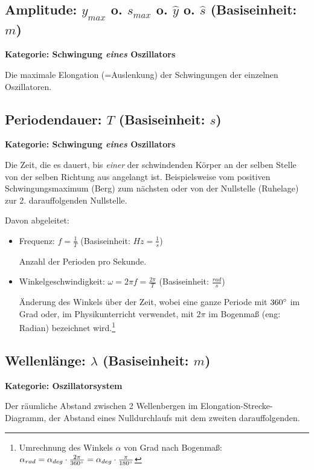 \subsection[Amplitude]{Amplitude: $y_{max}$ o. $s_{max}$ o. $\hat{y}$ o. $\hat{s}$ (Basiseinheit: $m$)}

\textbf{Kategorie: Schwingung \textit{eines} Oszillators}

\noindent Die maximale Elongation (=\glqq Auslenkung\grqq) der Schwingungen der einzelnen Oszillatoren.



\subsection[Periodendauer]{Periodendauer: $T$ (Basiseinheit: $s$)}

\textbf{Kategorie: Schwingung \textit{eines} Oszillators}
	
\noindent Die Zeit, die es dauert, bis \emph{einer} der schwindenden Körper an der selben Stelle von der selben Richtung aus angelangt ist. Beispielsweise vom positiven Schwingungsmaximum (\glqq Berg\grqq) zum nächsten oder von der Nullstelle (\glqq Ruhelage\grqq) zur 2. darauffolgenden Nullstelle.

Davon abgeleitet:
\begin{itemize}
	\item Frequenz: $f=\frac{1}{T}$ (Basiseinheit: $Hz=\frac{1}{s}$)
	
	Anzahl der Perioden pro Sekunde.
	\item Winkelgeschwindigkeit: $\omega=2 \pi f=\frac{2 \pi}{T}$ (Basiseinheit: $\frac{rad}{s}$)
		
	Änderung des Winkels über der Zeit, wobei eine ganze Periode mit $360 \degree$ im Grad oder, im Physikunterricht verwendet, mit $2 \pi$ im Bogenmaß (eng: \glqq Radian\grqq) bezeichnet wird.\footnote{Umrechnung des Winkels $\alpha$ von Grad nach Bogenmaß: $\alpha_{rad} = \alpha_{deg} \cdot \frac{2\pi}{360 \degree} = \alpha_{deg} \cdot \frac{\pi}{180 \degree} $}
\end{itemize}



\subsection[Wellenlänge]{Wellenlänge: $\lambda$ (Basiseinheit: $m$)}

\textbf{Kategorie: Oszillatorsystem}

\noindent Der räumliche Abstand zwischen 2 Wellenbergen im Elongation-Strecke-Diagramm, der Abstand eines Nulldurchlaufs mit dem zweiten darauffolgenden.




